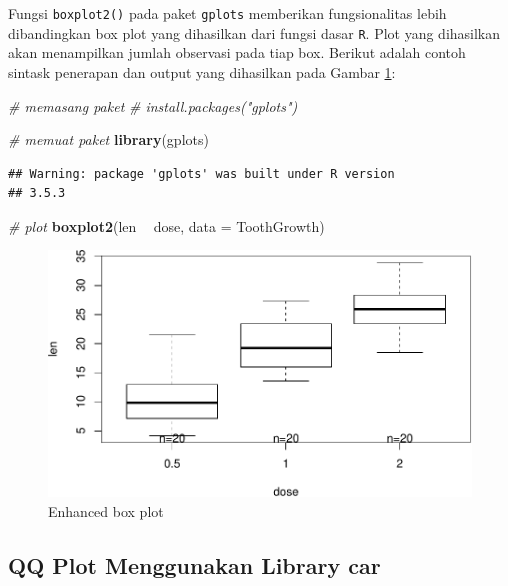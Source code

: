 \documentclass[]{book}
\newenvironment{Shaded}{\begin{snugshade}}{\end{snugshade}}
\newcommand{\KeywordTok}[1]{\textcolor[rgb]{0.13,0.29,0.53}{\textbf{#1}}}
\newcommand{\DataTypeTok}[1]{\textcolor[rgb]{0.13,0.29,0.53}{#1}}
\newcommand{\StringTok}[1]{\textcolor[rgb]{0.31,0.60,0.02}{#1}}
\newcommand{\CommentTok}[1]{\textcolor[rgb]{0.56,0.35,0.01}{\textit{#1}}}
\newcommand{\OperatorTok}[1]{\textcolor[rgb]{0.81,0.36,0.00}{\textbf{#1}}}
\newcommand{\NormalTok}[1]{#1}
\begin{document}
Fungsi \texttt{boxplot2()} pada paket \texttt{gplots} memberikan
fungsionalitas lebih dibandingkan box plot yang dihasilkan dari fungsi
dasar \texttt{R}. Plot yang dihasilkan akan menampilkan jumlah observasi
pada tiap box. Berikut adalah contoh sintask penerapan dan output yang
dihasilkan pada Gambar \ref{fig:gplotsboxplot2}:

\begin{Shaded}
\begin{Highlighting}[]
\CommentTok{# memasang paket}
\CommentTok{# install.packages("gplots")}

\CommentTok{# memuat paket}
\KeywordTok{library}\NormalTok{(gplots)}
\end{Highlighting}
\end{Shaded}

\begin{verbatim}
## Warning: package 'gplots' was built under R version
## 3.5.3
\end{verbatim}

\begin{Shaded}
\begin{Highlighting}[]
\CommentTok{# plot}
\KeywordTok{boxplot2}\NormalTok{(len }\OperatorTok{~}\StringTok{ }\NormalTok{dose, }\DataTypeTok{data =}\NormalTok{ ToothGrowth)}
\end{Highlighting}
\end{Shaded}

\begin{figure}

{\centering \includegraphics[width=0.7\linewidth]{EnvStat_files/figure-latex/gplotsboxplot2-1} 

}

\caption{Enhanced box plot}\label{fig:gplotsboxplot2}
\end{figure}

\subsection{QQ Plot Menggunakan Library
car}\label{qq-plot-menggunakan-library-car}
\end{document}
